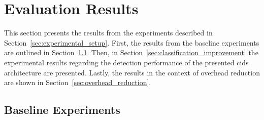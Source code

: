 \documentclass[../../main.tex]{subfiles}
\begin{document}
\section{Evaluation Results}\label{sec:results}

This section presents the results from the experiments described in Section~\ref{sec:experimental_setup}. First, the results from the baseline experiments are outlined in Section~\ref{sec:baseline}. Then, in Section~\ref{sec:classification_improvement} the experimental results regarding the detection performance of the presented \gls{cids} architecture are presented. Lastly, the results in the context of overhead reduction are shown in Section~\ref{sec:overhead_reduction}.

\subsection{Baseline Experiments}\label{sec:baseline}
\end{document}
